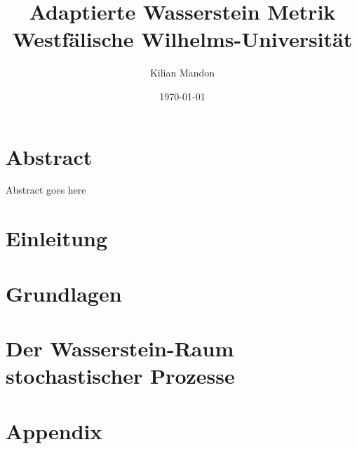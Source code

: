 \documentclass[12pt]{article}
\theoremstyle{definition}
\begin{document}
\title{
    {Adaptierte Wasserstein Metrik} \\
    {Westfälische Wilhelms-Universität}
}

\author{Kilian Mandon}
\date{\today}

\maketitle

\section*{Abstract}
Abstract goes here

\section{Einleitung}


\section{Grundlagen}


\section{Der Wasserstein-Raum stochastischer Prozesse}


\section{Appendix}

\end{document}
